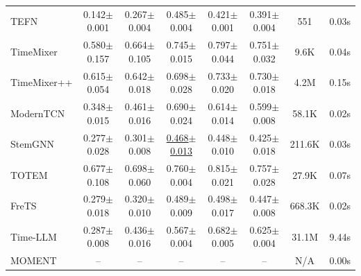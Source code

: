\begin{table}[h]
\begin{footnotesize}
\begin{tabular}{l|ccccc|cc}
        TEFN & 0.142$\pm$0.001 & 0.267$\pm$0.004 & 0.485$\pm$0.004 & 0.421$\pm$0.001 & 0.391$\pm$0.004 & 551 & 0.03s \\
        TimeMixer & 0.580$\pm$0.157 & 0.664$\pm$0.105 & 0.745$\pm$0.015 & 0.797$\pm$0.044 & 0.751$\pm$0.032 & 9.6K & 0.04s \\
        TimeMixer++ & 0.615$\pm$0.054 & 0.642$\pm$0.018 & 0.698$\pm$0.028 & 0.733$\pm$0.020 & 0.730$\pm$0.018 & 4.2M & 0.15s \\
        ModernTCN & 0.348$\pm$0.015 & 0.461$\pm$0.016 & 0.690$\pm$0.024 & 0.614$\pm$0.014 & 0.599$\pm$0.008 & 58.1K & 0.02s \\
        StemGNN & 0.277$\pm$0.028 & 0.301$\pm$0.008 & \underline{0.468$\pm$0.013} & 0.448$\pm$0.010 & 0.425$\pm$0.018 & 211.6K & 0.03s \\
        TOTEM & 0.677$\pm$0.108 & 0.698$\pm$0.060 & 0.760$\pm$0.004 & 0.815$\pm$0.021 & 0.757$\pm$0.028 & 27.9K & 0.07s \\
        FreTS & 0.279$\pm$0.018 & 0.320$\pm$0.010 & 0.489$\pm$0.009 & 0.498$\pm$0.017 & 0.447$\pm$0.008 & 668.3K & 0.02s \\
        Time-LLM & 0.287$\pm$0.008 & 0.436$\pm$0.016 & 0.567$\pm$0.004 & 0.682$\pm$0.005 & 0.625$\pm$0.004 & 31.1M & 9.44s \\
        MOMENT & -- & -- & -- & -- & -- & N/A & 0.00s \\
        \bottomrule
    \end{tabular}
    \end{footnotesize}
\end{table}